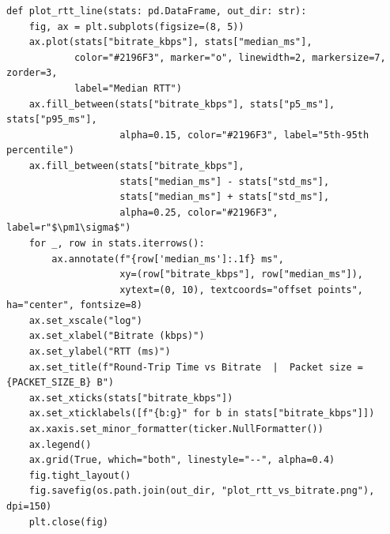 \begin{lstlisting}[style=appendix-py, caption={Latency vs.\ bitrate plotting}, label={lst:latency-bitrate-plot}]
def plot_rtt_line(stats: pd.DataFrame, out_dir: str):
    fig, ax = plt.subplots(figsize=(8, 5))
    ax.plot(stats["bitrate_kbps"], stats["median_ms"],
            color="#2196F3", marker="o", linewidth=2, markersize=7, zorder=3,
            label="Median RTT")
    ax.fill_between(stats["bitrate_kbps"], stats["p5_ms"], stats["p95_ms"],
                    alpha=0.15, color="#2196F3", label="5th-95th percentile")
    ax.fill_between(stats["bitrate_kbps"],
                    stats["median_ms"] - stats["std_ms"],
                    stats["median_ms"] + stats["std_ms"],
                    alpha=0.25, color="#2196F3", label=r"$\pm1\sigma$")
    for _, row in stats.iterrows():
        ax.annotate(f"{row['median_ms']:.1f} ms",
                    xy=(row["bitrate_kbps"], row["median_ms"]),
                    xytext=(0, 10), textcoords="offset points", ha="center", fontsize=8)
    ax.set_xscale("log")
    ax.set_xlabel("Bitrate (kbps)")
    ax.set_ylabel("RTT (ms)")
    ax.set_title(f"Round-Trip Time vs Bitrate  |  Packet size = {PACKET_SIZE_B} B")
    ax.set_xticks(stats["bitrate_kbps"])
    ax.set_xticklabels([f"{b:g}" for b in stats["bitrate_kbps"]])
    ax.xaxis.set_minor_formatter(ticker.NullFormatter())
    ax.legend()
    ax.grid(True, which="both", linestyle="--", alpha=0.4)
    fig.tight_layout()
    fig.savefig(os.path.join(out_dir, "plot_rtt_vs_bitrate.png"), dpi=150)
    plt.close(fig)


\end{lstlisting}
